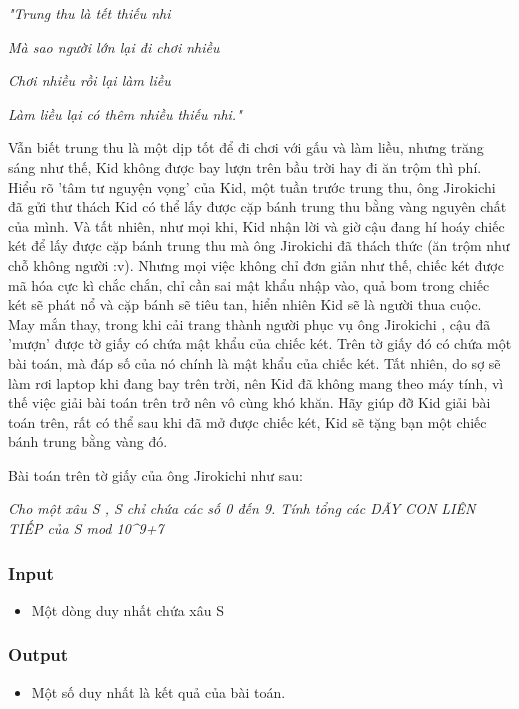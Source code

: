 

\emph{"Trung thu là tết thiếu nhi}

\emph{Mà sao người lớn lại đi chơi nhiều}

\emph{Chơi nhiều rồi lại làm liều}

\emph{Làm liều lại có thêm nhiều thiếu nhi."}

Vẫn biết trung thu là một dịp tốt để đi chơi với gấu và làm liều, nhưng trăng sáng như thế, Kid không được bay lượn trên bầu trời hay đi ăn trộm thì phí. Hiểu rõ 'tâm tư nguyện vọng' của Kid, một tuần trước trung thu, ông Jirokichi đã gửi thư thách Kid có thể lấy được cặp bánh trung thu bằng vàng nguyên chất của mình. Và tất nhiên, như mọi khi, Kid nhận lời và giờ cậu đang hí hoáy chiếc két để lấy được cặp bánh trung thu mà ông Jirokichi đã thách thức (ăn trộm như chỗ không người :v). Nhưng mọi việc không chỉ đơn giản như thế, chiếc két được mã hóa cực kì chắc chắn, chỉ cần sai mật khẩu nhập vào, quả bom trong chiếc két sẽ phát nổ và cặp bánh sẽ tiêu tan, hiển nhiên Kid sẽ là người thua cuộc. May mắn thay, trong khi cải trang thành người phục vụ ông Jirokichi , cậu đã 'mượn' được tờ giấy có chứa mật khẩu của chiếc két. Trên tờ giấy đó có chứa một bài toán, mà đáp số của nó chính là mật khẩu của chiếc két. Tất nhiên, do sợ sẽ làm rơi laptop khi đang bay trên trời, nên Kid đã không mang theo máy tính, vì thế việc giải bài toán trên trở nên vô cùng khó khăn. Hãy giúp đỡ Kid giải bài toán trên, rất có thể sau khi đã mở được chiếc két, Kid sẽ tặng bạn một chiếc bánh trung bằng vàng đó.

Bài toán trên tờ giấy của ông Jirokichi như sau:

\emph{Cho một xâu S , S chỉ chứa các số 0 đến 9. Tính tổng các DÃY CON LIÊN TIẾP của S mod 10\textasciicircum9+7 }

\subsubsection{Input}
\begin{itemize}
	\item Một dòng duy nhất chứa xâu S
\end{itemize}

\subsubsection{Output}
\begin{itemize}
	\item Một số duy nhất là kết quả của bài toán.
\end{itemize}

